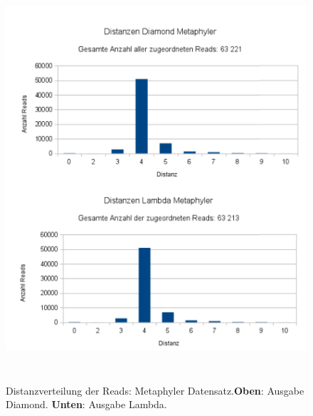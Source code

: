 \documentclass[10pt, a4paper]{article}[08.12.2015]
\begin{document}
     \begin{figure}[H]
      \centering
      \noindent\includegraphics[width=\linewidth,height=15cm,
      keepaspectratio]{Abbildungen/Metaphyler_Distanzen_both.png}
      \caption[Distanzverteilung der Reads: Metaphyler Datensatz.]{\small{Distanzverteilung der Reads: Metaphyler Datensatz.\newline \textbf{Oben}: Ausgabe Diamond. \textbf{Unten}: Ausgabe Lambda.}}
    \end{figure}
\end{document}
